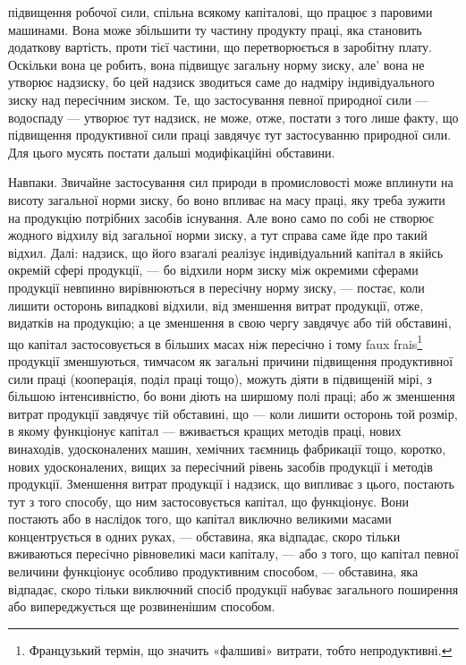 \parcont{}  %
підвищення робочої сили, спільна всякому капіталові, що працює з паровими
машинами. Вона може збільшити ту частину продукту праці, яка становить
додаткову вартість, проти тієї частини, що перетворюється в заробітну плату.
Оскільки вона це робить, вона підвищує загальну норму зиску, але' вона не
утворює надзиску, бо цей надзиск зводиться саме до надміру індивідуального
зиску над пересічним зиском. Те, що застосування певної природної сили — водоспаду
— утворює тут надзиск, не може, отже, постати з того лише факту, що
підвищення продуктивної сили праці завдячує тут застосуванню природної сили.
Для цього мусять постати дальші модифікаційні обставини.

Навпаки. Звичайне застосування сил природи в промисловості може вплинути
на висоту загальної норми зиску, бо воно впливає на масу праці, яку
треба зужити на продукцію потрібних засобів існування. Але воно само по собі не
створює жодного відхилу від загальної норми зиску, а тут справа саме йде
про такий відхил. Далі: надзиск, що його взагалі реалізує індивідуальний капітал
в якійсь окремій сфері продукції, — бо відхили норм зиску між окремими сферами
продукції невпинно вирівнюються в пересічну норму зиску, — постає, коли лишити
осторонь випадкові відхили, від зменшення витрат продукції, отже, видатків на
продукцію; а це зменшення в свою чергу завдячує або тій обставині, що
капітал застосовується в більших масах ніж пересічно і тому faux frais\footnote*{
Французький термін, що значить «фалшиві» витрати, тобто непродуктивні. 
}
продукції зменшуються, тимчасом як загальні причини підвищення продуктивної
сили праці (кооперація, поділ праці тощо), можуть діяти в підвищеній мірі, з
більшою інтенсивністю, бо вони діють на ширшому полі праці; або ж зменшення
витрат продукції завдячує тій обставині, що — коли лишити осторонь той розмір,
в якому функціонує капітал — вживається кращих методів праці, нових винаходів,
удосконалених машин, хемічних таємниць фабрикації тощо, коротко, нових
удосконалених, вищих за пересічний рівень засобів продукції і методів продукції.
Зменшення витрат продукції і надзиск, що випливає з цього, постають тут
з того способу, що ним застосовується капітал, що функціонує. Вони постають
або в наслідок того, що капітал виключно великими масами концентрується в
одних руках, — обставина, яка відпадає, скоро тільки вживаються пересічно
рівновеликі маси капіталу, — або з того, що капітал певної величини функціонує
особливо продуктивним способом, — обставина, яка відпадає, скоро тільки
виключний спосіб продукції набуває загального поширення або випереджується
ще розвиненішим способом.

